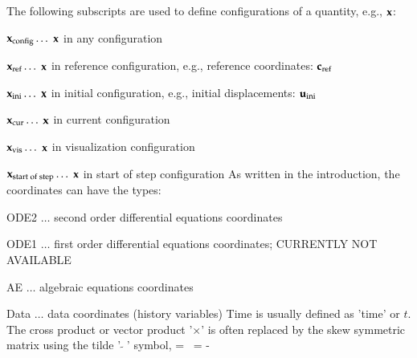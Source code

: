 \documentclass[11pt,a4paper]{book} %
\newcommand{\cIni}{_\mathrm{ini}} %
\newcommand{\cRef}{_\mathrm{ref}} %
\newcommand{\cCur}{_\mathrm{cur}} %
\newcommand{\cVis}{_\mathrm{vis}} %
\newcommand{\cSOS}{_\mathrm{start\;of\;step}}
\newcommand{\cConfig}{_\mathrm{config}} %
\begin{document}
%
The following subscripts are used to define configurations of a quantity, e.g., $\mathbf{x}$:
\bi
  \item $\xv\cConfig \ldots$ $\mathbf{x}$ in any configuration
  \item $\xv\cRef \ldots$ $\mathbf{x}$ in reference configuration, e.g., reference coordinates: $\cv\cRef$
  \item $\xv\cIni \ldots$ $\mathbf{x}$ in initial configuration, e.g., initial displacements: $\uv\cIni$
  \item $\xv\cCur \ldots$ $\mathbf{x}$ in current configuration
  \item $\xv\cVis \ldots$ $\mathbf{x}$ in visualization configuration
  \item $\xv\cSOS \ldots$ $\mathbf{x}$ in start of step configuration
\ei
As written in the introduction, the coordinates can have the types:
\bi
  \item ODE2 $\ldots$ second order differential equations coordinates
  \item ODE1 $\ldots$ first order differential equations coordinates; CURRENTLY NOT AVAILABLE
  \item AE $\ldots$ algebraic equations coordinates
  \item Data $\ldots$ data coordinates (history variables)
\ei
Time is usually defined as 'time' or $t$.
The cross product or vector product '$\times$' is often replaced by the skew symmetric matrix using the tilde '$\tilde{\;\;}$' symbol,
\be
  \av \times \bv = \tilde \av \, \bv = -\tilde \bv \, \av
\ee
\end{document}
